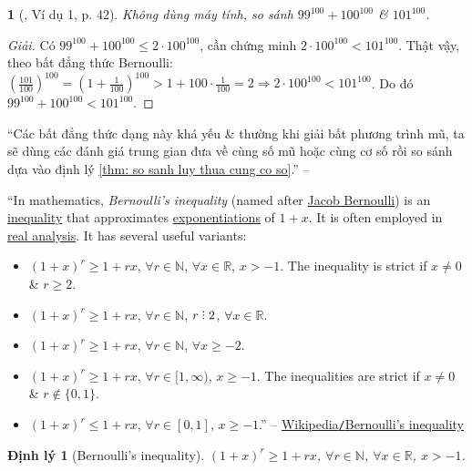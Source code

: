 \documentclass{article}
\newtheorem{baitoan}{}
\newtheorem{dinhly}{Định lý}
\DeclareRobustCommand{\divby}{%
	\mathrel{\vbox{\baselineskip.65ex\lineskiplimit0pt\hbox{.}\hbox{.}\hbox{.}}}%
}
\begin{document}
\begin{baitoan}[\cite{TLCT_giai_tich_12}, Ví dụ 1, p. 42]
	Không dùng máy tính, so sánh $99^{100} + 100^{100}$ \& $101^{100}$.
\end{baitoan}

\begin{proof}[Giải]
	Có $99^{100} + 100^{100}\le 2\cdot 100^{100}$, cần chứng minh $2\cdot 100^{100} < 101^{100}$. Thật vậy, theo bất đẳng thức Bernoulli: $\left(\frac{101}{100}\right)^{100} = \left(1 + \frac{1}{100}\right)^{100} > 1 + 100\cdot\frac{1}{100} = 2\Rightarrow 2\cdot 100^{100} < 101^{100}$. Do đó $99^{100} + 100^{100} < 101^{100}$.
\end{proof}
``Các bất đẳng thức dạng này khá yếu \& thường khi giải bất phương trình mũ, ta sẽ dùng các đánh giá trung gian đưa về cùng số mũ hoặc cùng cơ số rồi so sánh dựa vào định lý \ref{thm: so sanh luy thua cung co so}.'' -- \cite[p. 42]{TLCT_giai_tich_12}

``In mathematics, \textit{Bernoulli's inequality} (named after \href{https://en.wikipedia.org/wiki/Jacob_Bernoulli}{Jacob Bernoulli}) is an \href{https://en.wikipedia.org/wiki/Inequality_(mathematics)}{inequality} that approximates \href{https://en.wikipedia.org/wiki/Exponentiation}{exponentiations} of $1 + x$. It is often employed in \href{https://en.wikipedia.org/wiki/Real_analysis}{real analysis}. It has several useful variants:
\begin{itemize}
	\item $(1 + x)^r\ge 1 + rx$, $\forall r\in\mathbb{N}$, $\forall x\in\mathbb{R}$, $x > - 1$. The inequality is strict if $x\ne 0$ \& $r\ge 2$.
	\item $(1 + x)^r\ge 1 + rx$, $\forall r\in\mathbb{N}$, $r\divby 2$, $\forall x\in\mathbb{R}$.
	\item $(1 + x)^r\ge 1 + rx$, $\forall r\in\mathbb{N}$, $\forall x\ge -2$.
	\item $(1 + x)^r\ge 1 + rx$, $\forall r\in[1,\infty)$, $x\ge -1$. The inequalities are strict if $x\ne 0$ \& $r\notin\{0,1\}$.
	\item $(1 + x)^r\le 1 + rx$, $\forall r\in[0,1]$, $x\ge -1$.'' -- \href{https://en.wikipedia.org/wiki/Bernoulli%27s_inequality}{Wikipedia\texttt{/}Bernoulli's inequality}
\end{itemize}

\begin{dinhly}[Bernoulli's inequality]
	$(1 + x)^r\ge 1 + rx$, $\forall r\in\mathbb{N}$, $\forall x\in\mathbb{R}$, $x > - 1$.
\end{dinhly}
\end{document}
